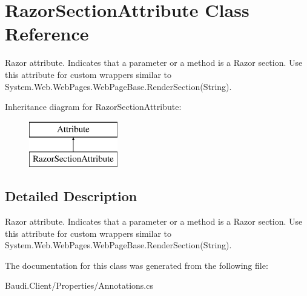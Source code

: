 \hypertarget{class_razor_section_attribute}{}\section{Razor\+Section\+Attribute Class Reference}
\label{class_razor_section_attribute}


Razor attribute. Indicates that a parameter or a method is a Razor section. Use this attribute for custom wrappers similar to {\ttfamily System.\+Web.\+Web\+Pages.\+Web\+Page\+Base.\+Render\+Section(\+String)}.  


Inheritance diagram for Razor\+Section\+Attribute\+:\begin{figure}[H]
\begin{center}
\leavevmode
\includegraphics[height=2.000000cm]{class_razor_section_attribute}
\end{center}
\end{figure}


\subsection{Detailed Description}
Razor attribute. Indicates that a parameter or a method is a Razor section. Use this attribute for custom wrappers similar to {\ttfamily System.\+Web.\+Web\+Pages.\+Web\+Page\+Base.\+Render\+Section(\+String)}. 



The documentation for this class was generated from the following file\+:\begin{DoxyCompactItemize}
\item 
Baudi.\+Client/\+Properties/Annotations.\+cs\end{DoxyCompactItemize}
